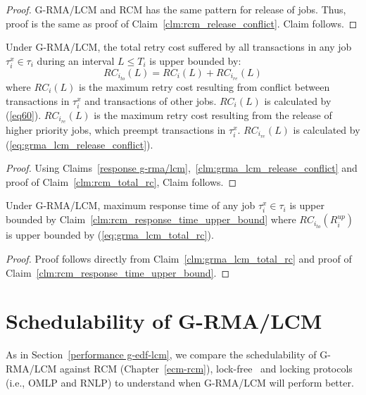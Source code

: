 %
\begin{proof}
%
G-RMA/LCM and RCM has the same pattern for release of jobs. Thus, proof is the same as proof of Claim~\ref{clm:rcm_release_conflict}. Claim follows.
%
\end{proof}
%
\begin{clm}\label{clm:grma_lcm_total_rc}
Under G-RMA/LCM, the total retry cost suffered by all transactions in any job $\tau_i^x \in \tau_i$ during an interval $L\le T_i$ is upper bounded by:
%
\begin{equation}
RC_{i_{to}}(L)=RC_i(L)+RC_{i_{re}}(L)
\label{eq:grma_lcm_total_rc}
\end{equation}
%
where $RC_i(L)$ is the maximum retry cost resulting from conflict between transactions in $\tau_i^x$ and transactions of other jobs. $RC_i(L)$ is calculated by (\ref{eq60}). $RC_{i_{re}}(L)$ is the maximum retry cost resulting from the release of higher priority jobs, which preempt transactions in $\tau_i^x$. $RC_{i_{re}}(L)$ is calculated by (\ref{eq:grma_lcm_release_conflict}).
%
\end{clm}
%
\begin{proof}\normalfont
%
Using Claims~\ref{response g-rma/lcm},~\ref{clm:grma_lcm_release_conflict} and proof of Claim~\ref{clm:rcm_total_rc}, Claim follows.
%
\end{proof}
%
\begin{clm}\label{clm:grma_lcm_response_time_upper_bound}
%
Under G-RMA/LCM, maximum response time of any job $\tau_i^x \in \tau_i$ is upper bounded by Claim~\ref{clm:rcm_response_time_upper_bound} where $RC_{i_{to}}(R_i^{up})$ is upper bounded by (\ref{eq:grma_lcm_total_rc}).
%
\end{clm}
%
\begin{proof}
%
Proof follows directly from Claim~\ref{clm:grma_lcm_total_rc} and proof of Claim~\ref{clm:rcm_response_time_upper_bound}.
%
\end{proof}
%
\section{Schedulability of G-RMA/LCM}\label{rma eval}
%
As in Section~\ref{performance g-edf-lcm}, we compare the schedulability of G-RMA/LCM against RCM (Chapter~\ref{ecm-rcm}), lock-free~\cite{key-5} and locking protocols (i.e., OMLP\cite{springerlink:10.1007/s10617-012-9090-1,key-3} and RNLP\cite{6257574}) to understand when G-RMA/LCM will perform better. 
%
